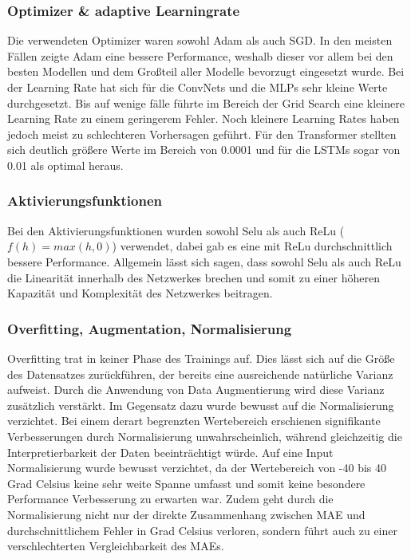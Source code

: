 \documentclass[acmtog, authorversion]{acmart} %
\begin{document}
\subsubsection{Optimizer \& adaptive Learningrate}
Die verwendeten Optimizer waren sowohl Adam als auch SGD. In den meisten Fällen zeigte Adam eine bessere Performance, weshalb dieser vor allem bei den besten Modellen und dem Großteil aller Modelle bevorzugt eingesetzt wurde.
Bei der Learning Rate hat sich für die ConvNets und die MLPs sehr kleine Werte durchgesetzt. Bis auf wenige fälle führte im Bereich der Grid Search eine kleinere Learning Rate zu einem geringerem Fehler. Noch kleinere Learning Rates haben jedoch meist zu schlechteren Vorhersagen geführt. Für den Transformer stellten sich deutlich größere Werte im Bereich von 0.0001 und für die LSTMs sogar von 0.01 als optimal heraus. 

\subsubsection{Aktivierungsfunktionen}
Bei den Aktivierungsfunktionen wurden sowohl Selu als auch ReLu ($f(h)=max(h,0)$) verwendet, dabei gab es eine mit ReLu durchschnittlich bessere Performance. Allgemein lässt sich sagen, dass sowohl Selu als auch ReLu die Linearität innerhalb des Netzwerkes brechen und somit zu einer höheren Kapazität und Komplexität des Netzwerkes beitragen.


\subsubsection{Overfitting, Augmentation, Normalisierung} 
Overfitting trat in keiner Phase des Trainings auf. Dies lässt sich auf die Größe des Datensatzes zurückführen, der bereits eine ausreichende natürliche Varianz aufweist. Durch die Anwendung von Data Augmentierung wird diese Varianz zusätzlich verstärkt.
Im Gegensatz dazu wurde bewusst auf die Normalisierung verzichtet. Bei einem derart begrenzten Wertebereich erschienen signifikante Verbesserungen durch Normalisierung unwahrscheinlich, während gleichzeitig die Interpretierbarkeit der Daten beeinträchtigt würde. 
Auf eine Input Normalisierung wurde bewusst verzichtet, da der Wertebereich von -40 bis 40 Grad Celsius keine sehr weite Spanne umfasst und somit keine besondere Performance Verbesserung zu erwarten war. Zudem geht durch die Normalisierung nicht nur der direkte Zusammenhang zwischen MAE und durchschnittlichem Fehler in Grad Celsius verloren, sondern führt auch zu einer verschlechterten Vergleichbarkeit des MAEs.
\end{document}
